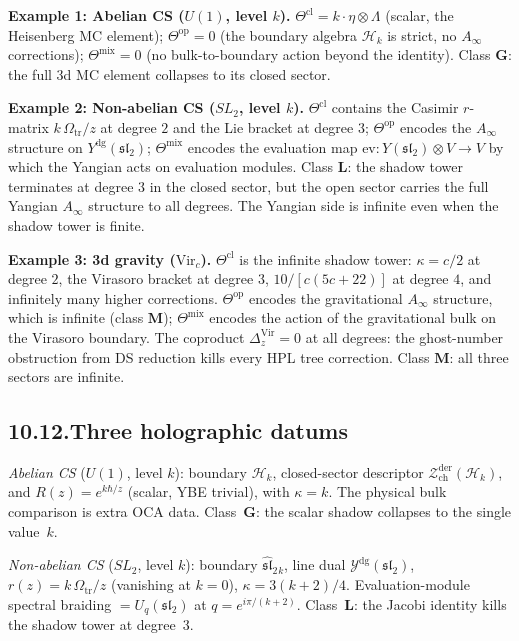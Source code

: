 \documentclass[11pt,reqno]{amsart}
\theoremstyle{definition}
\theoremstyle{remark}
\providecommand{\cH}{\mathcal{H}}
\providecommand{\cZ}{\mathcal{Z}}
\providecommand{\Vir}{\mathrm{Vir}}
\providecommand{\Ydg}{\mathcal{Y}^{\mathrm{dg}}}
\providecommand{\dg}{\mathrm{dg}}
\providecommand{\der}{\mathrm{der}}
\providecommand{\ch}{\mathrm{ch}}
\numberwithin{equation}{section}
\begin{document}
\medskip\noindent\textbf{Example 1: Abelian CS ($U(1)$, level $k$).}\enspace
$\Theta^{\mathrm{cl}} = k \cdot \eta \otimes \Lambda$
(scalar, the Heisenberg MC element);
$\Theta^{\mathrm{op}} = 0$ (the boundary algebra $\cH_k$ is
strict, no $A_\infty$ corrections);
$\Theta^{\mathrm{mix}} = 0$ (no bulk-to-boundary action beyond
the identity). Class $\mathbf{G}$: the full 3d MC element
collapses to its closed sector.

\medskip\noindent\textbf{Example 2: Non-abelian CS ($SL_2$, level $k$).}\enspace
$\Theta^{\mathrm{cl}}$ contains the Casimir $r$-matrix
$k\,\Omega_{\mathrm{tr}}/z$ at degree $2$ and the Lie bracket at degree $3$;
$\Theta^{\mathrm{op}}$ encodes the $A_\infty$ structure on
$Y^{\dg}(\mathfrak{sl}_2)$; $\Theta^{\mathrm{mix}}$ encodes
the evaluation map $\mathrm{ev}\colon Y(\mathfrak{sl}_2) \otimes
V \to V$ by which the Yangian acts on evaluation modules.
Class $\mathbf{L}$: the shadow tower terminates at degree $3$
in the closed sector, but the open sector carries the full
Yangian $A_\infty$ structure to all degrees. The Yangian side is
infinite even when the shadow tower is finite.

\medskip\noindent\textbf{Example 3: 3d gravity ($\Vir_c$).}\enspace
$\Theta^{\mathrm{cl}}$ is the infinite shadow tower:
$\kappa = c/2$ at degree $2$, the Virasoro bracket at degree $3$,
$10/[c(5c+22)]$ at degree $4$, and infinitely many higher
corrections. $\Theta^{\mathrm{op}}$ encodes the gravitational
$A_\infty$ structure, which is infinite (class $\mathbf{M}$);
$\Theta^{\mathrm{mix}}$ encodes the action of the gravitational
bulk on the Virasoro boundary. The coproduct
$\Delta_z^{\Vir} = 0$ at all degrees: the ghost-number
obstruction from DS reduction kills every HPL tree correction.
Class $\mathbf{M}$: all three sectors are infinite.

\subsection*{10.12.\enspace Three holographic datums}

\noindent\emph{Abelian CS} ($U(1)$, level $k$): boundary
$\cH_k$, closed-sector descriptor $\cZ^{\der}_{\ch}(\cH_k)$, and
$R(z) = e^{k\hbar/z}$ (scalar, YBE trivial), with $\kappa = k$.
The physical bulk comparison is extra OCA data. Class~$\mathbf{G}$:
the scalar shadow collapses to the single value~$k$.

\smallskip
\noindent\emph{Non-abelian CS} ($SL_2$, level $k$): boundary
$\widehat{\mathfrak{sl}}_2{}_k$, line dual
$\Ydg(\mathfrak{sl}_2)$, $r(z) = k\,\Omega_{\mathrm{tr}}/z$ (vanishing at
$k = 0$), $\kappa = 3(k{+}2)/4$. Evaluation-module
spectral braiding $= U_q(\mathfrak{sl}_2)$ at
$q = e^{i\pi/(k+2)}$. Class~$\mathbf{L}$: the Jacobi identity
kills the shadow tower at degree~$3$.
\end{document}
